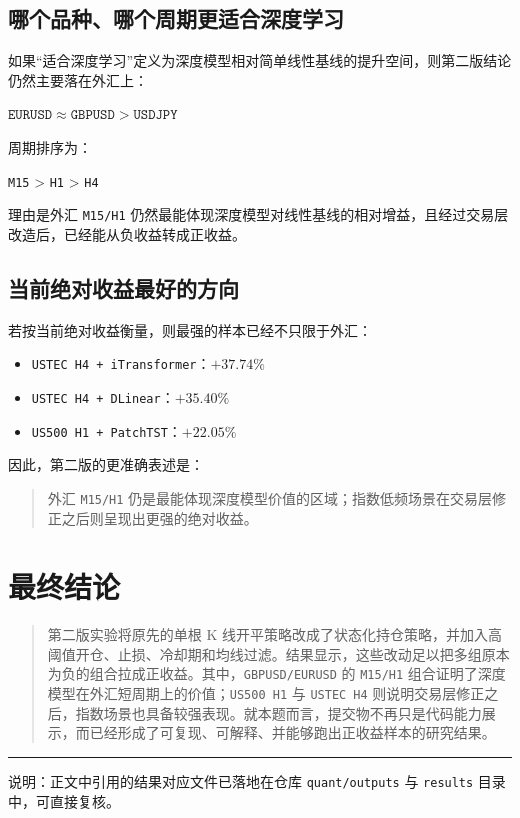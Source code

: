 \documentclass[11pt,a4paper]{ctexart}
\begin{document}
\subsection{哪个品种、哪个周期更适合深度学习}

如果“适合深度学习”定义为深度模型相对简单线性基线的提升空间，则第二版结论仍然主要落在外汇上：
\begin{center}
$\texttt{EURUSD} \approx \texttt{GBPUSD} > \texttt{USDJPY}$
\end{center}

周期排序为：
\begin{center}
\texttt{M15} \quad > \quad \texttt{H1} \quad > \quad \texttt{H4}
\end{center}

理由是外汇 \texttt{M15/H1} 仍然最能体现深度模型对线性基线的相对增益，且经过交易层改造后，已经能从负收益转成正收益。

\subsection{当前绝对收益最好的方向}

若按当前绝对收益衡量，则最强的样本已经不只限于外汇：
\begin{itemize}
  \item \texttt{USTEC H4 + iTransformer}：\(+37.74\%\)
  \item \texttt{USTEC H4 + DLinear}：\(+35.40\%\)
  \item \texttt{US500 H1 + PatchTST}：\(+22.05\%\)
\end{itemize}

因此，第二版的更准确表述是：
\begin{quote}
外汇 \texttt{M15/H1} 仍是最能体现深度模型价值的区域；指数低频场景在交易层修正之后则呈现出更强的绝对收益。
\end{quote}

\section{最终结论}

\begin{quote}
第二版实验将原先的单根 K 线开平策略改成了状态化持仓策略，并加入高阈值开仓、止损、冷却期和均线过滤。结果显示，这些改动足以把多组原本为负的组合拉成正收益。其中，\texttt{GBPUSD/EURUSD} 的 \texttt{M15/H1} 组合证明了深度模型在外汇短周期上的价值；\texttt{US500 H1} 与 \texttt{USTEC H4} 则说明交易层修正之后，指数场景也具备较强表现。就本题而言，提交物不再只是代码能力展示，而已经形成了可复现、可解释、并能够跑出正收益样本的研究结果。
\end{quote}

\vspace{0.8em}
\hrule
\vspace{0.7em}

{\small
说明：正文中引用的结果对应文件已落地在仓库 \texttt{quant/outputs} 与 \texttt{results} 目录中，可直接复核。}
\end{document}

